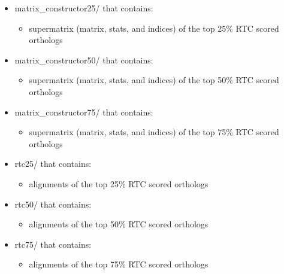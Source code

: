 \documentclass{article}
\begin{document}
\begin{description}
\begin{description}
\begin{itemize}
                    \begin{itemize}
                        \item matrix\_constructor25/ that contains:
                        \begin{itemize}
                            \item supermatrix (matrix, stats, and indices) of the top 25\% RTC scored orthologs
                        \end{itemize}
                        \item matrix\_constructor50/ that contains:
                        \begin{itemize}
                            \item supermatrix (matrix, stats, and indices) of the top 50\% RTC scored orthologs
                        \end{itemize}
                        \item matrix\_constructor75/ that contains:
                        \begin{itemize}
                            \item supermatrix (matrix, stats, and indices) of the top 75\% RTC scored orthologs
                        \end{itemize}
                        \item rtc25/ that contains: 
                        \begin{itemize}
                            \item alignments of the top 25\% RTC scored orthologs
                        \end{itemize}
                        \item rtc50/ that contains: 
                        \begin{itemize}
                            \item alignments of the top 50\% RTC scored orthologs
                        \end{itemize}
                        \item rtc75/ that contains: 
                        \begin{itemize}
                            \item alignments of the top 75\% RTC scored orthologs
                        \end{itemize}
                    \end{itemize}
                \end{itemize}
            \end{description}
        \end{description}
                                
\end{document}

